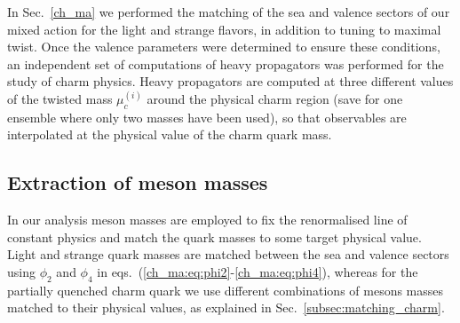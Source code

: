 In Sec.~\ref{ch_ma} we performed the matching of the sea and valence sectors of our mixed action for the light and strange flavors, in addition to tuning to maximal twist. Once the valence parameters were determined to ensure these conditions, an independent set of computations of heavy propagators was performed for the study of charm physics. Heavy propagators are computed at three different values of the twisted  mass $\mu_c^{(i)}$ around the physical charm region (save for one ensemble where only two masses have been used), so that observables are interpolated at the physical value of the charm quark mass. 

\subsection{Extraction of meson masses}
 
In our analysis meson masses are employed to fix the renormalised line of constant physics and match the quark masses to some target physical value.  Light and strange quark masses are matched between the sea and valence sectors using $\phi_2$ and $\phi_4$ in eqs.~(\ref{ch_ma:eq:phi2}-\ref{ch_ma:eq:phi4}), whereas for the partially quenched charm quark we use different combinations of mesons masses matched to their physical values, as explained in Sec.~\ref{subsec:matching_charm}.
 
